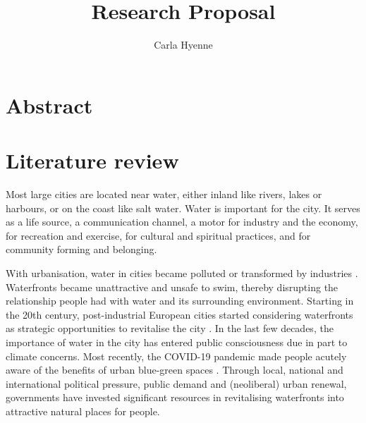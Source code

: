 \documentclass{article}
\title{Research Proposal}
\author{Carla Hyenne}
\date{}
\begin{document}
\maketitle

\tableofcontents 


\section{Abstract}


\pagebreak
\section{Literature review}

Most large cities are located near water, either inland like rivers, lakes or harbours, or on the coast like salt water. Water is important for the city. It serves as a life source, a communication channel, a motor for industry and the economy, for recreation and exercise, for cultural and spiritual practices, and for community forming and belonging. 

With urbanisation, water in cities became polluted or transformed by industries \parencite{kampa_langaas_anzaldua_2016}. 
Waterfronts became unattractive and unsafe to swim, thereby disrupting the relationship people had with water and its surrounding environment.
Starting in the 20th century, post-industrial European cities started considering waterfronts as strategic opportunities to revitalise the city \parencite{del2021dismantling}. In the last few decades, the importance of water in the city has entered public consciousness due in part to climate concerns. Most recently, the COVID-19 pandemic made people acutely aware of the benefits of urban blue-green spaces \parencite{kohsaka2021urban}.
Through local, national and international political pressure, public demand and (neoliberal) urban renewal, governments have invested significant resources in revitalising waterfronts into attractive natural places for people. 

\end{document}
